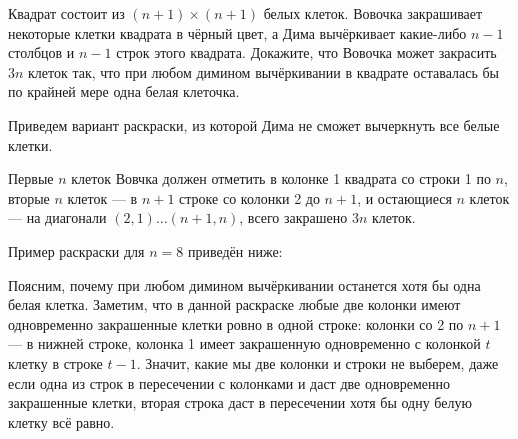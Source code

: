\begin{itemize}
\itC Квадрат состоит из $(n+1) \times (n+1)$ белых клеток. Вовочка закрашивает некоторые клетки квадрата в чёрный цвет, а Дима вычёркивает какие-либо $n-1$ столбцов и $n-1$ строк этого квадрата. Докажите, что Вовочка может закрасить $3n$ клеток так, что при любом димином вычёркивании в квадрате оставалась бы по крайней мере одна белая клеточка.

\itr Приведем вариант раскраски, из которой Дима не сможет вычеркнуть все белые клетки. 

Первые $n$ клеток Вовчка должен отметить в колонке 1 квадрата со строки 1 по $n$, вторые $n$ клеток --- в $n+1$ строке со колонки 2 до $n+1$, и остающиеся $n$ клеток ---  на диагонали $(2,1) \ldots (n+1,n)$, всего закрашено $3n$ клеток.

Пример раскраски для $n=8$ приведён ниже:

\begin{center}\end{center}

Поясним, почему при любом димином вычёркивании останется хотя бы одна белая клетка. 
Заметим, что в данной раскраске любые две 
колонки имеют одновременно закрашенные клетки ровно в одной строке: колонки со 2 по $n+1$ --- 
в нижней строке, колонка 1 имеет закрашенную одновременно с колонкой $t$ клетку в строке $t-1$.
Значит, какие мы две колонки и строки не выберем, даже если одна из строк в пересечении с колонками
и даст две одновременно закрашенные клетки, вторая строка даст в пересечении хотя бы одну белую 
клетку всё равно.

\end{itemize}
